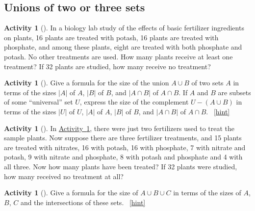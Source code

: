\documentclass[10pt,]{book}
\theoremstyle{plain}
\theoremstyle{definition}
\theoremstyle{definition}
\theoremstyle{definition}
\newtheorem{activity}[project]{Activity}
\numberwithin{equation}{chapter}
\begin{document}
\subsection[{Unions of two or three sets}]{Unions of two or three sets}\label{subsection-26}
\begin{activity}[]\label{fertilizer2}
\hypertarget{p-1169}{}%
In a biology lab study of the effects of basic fertilizer ingredients on plants, 16 plants are treated with potash, 16 plants are treated with phosphate, and among these plants, eight are treated with both phosphate and potash. No other treatments are used. How many plants receive at least one treatment? If 32 plants are studied, how many receive no treatment?%
\end{activity}
\begin{activity}[]\label{twosetintersection}
\hypertarget{p-1171}{}%
Give a formula for the size of the union \(A\cup B\) of two sets \(A\) in terms of the sizes \(|A|\) of \(A\), \(|B|\) of \(B\), and \(|A\cap B|\) of \(A\cap B\). If \(A\) and \(B\) are subsets of some ``universal'' set \(U\), express the size of the complement \(U-(A\cup B)\) in terms of the sizes \(|U|\) of \(U\), \(|A|\) of \(A\), \(|B|\) of \(B\), and \(|A\cap B|\) of \(A\cap B\).%
~\hfill{\tiny\hyperlink{a-217}{[hint]}\hypertarget{q-217}{}}\end{activity}
\begin{activity}[]\label{activity-211}
\hypertarget{p-1175}{}%
In \hyperref[fertilizer2]{Activity~\ref{fertilizer2}}, there were just two fertilizers used to treat the sample plants. Now suppose there are three fertilizer treatments, and 15 plants are treated with nitrates, 16 with potash, 16 with phosphate, 7 with nitrate and potash, 9 with nitrate and phosphate, 8 with potash and phosphate and 4 with all three. Now how many plants have been treated? If 32 plants were studied, how many received no treatment at all?%
\end{activity}
\begin{activity}[]\label{threesetintersection}
\hypertarget{p-1177}{}%
Give a formula for the size of \(A\cup B\cup C\) in terms of the sizes of \(A\), \(B\), \(C\) and the intersections of these sets.%
~\hfill{\tiny\hyperlink{a-219}{[hint]}\hypertarget{q-219}{}}\end{activity}
\typeout{************************************************}
\typeout{************************************************}
\end{document}
